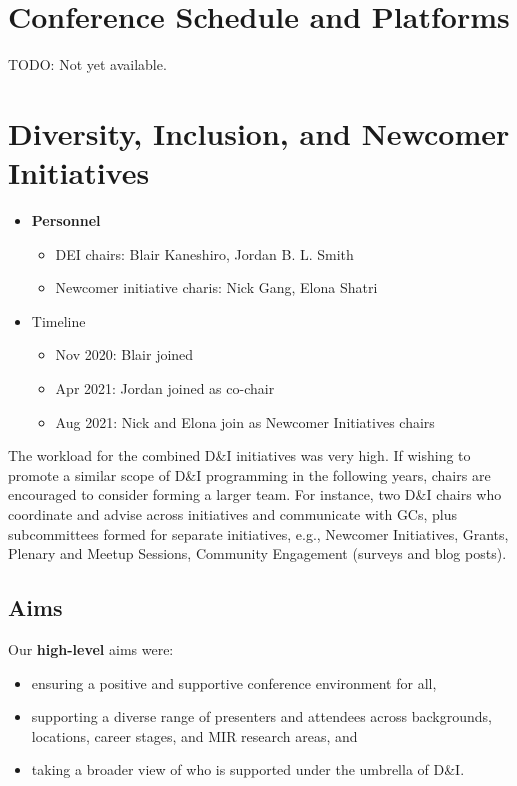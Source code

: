 \documentclass[%
10pt,								%
]
{scrartcl}
\begin{document}
\section{Conference Schedule and Platforms}
    TODO: Not yet available.
    
\section{Diversity, Inclusion, and Newcomer Initiatives}
    \begin{itemize}
        \item \textbf{Personnel}
            \begin{itemize}
                \item   DEI chairs: Blair Kaneshiro, Jordan B. L. Smith
                \item   Newcomer initiative charis: Nick Gang, Elona Shatri
            \end{itemize}
        \item   Timeline
            \begin{itemize}
                \item   Nov 2020: Blair joined 
                \item   Apr 2021: Jordan joined as co-chair
                \item   Aug 2021: Nick and Elona join as Newcomer Initiatives chairs
            \end{itemize}
    \end{itemize}
    
    The workload for the combined D\&I initiatives was very high. If wishing to promote a similar scope of D\&I programming in the following years, chairs are encouraged to consider forming a larger team. For instance, two D\&I chairs who coordinate and advise across initiatives and communicate with GCs, plus subcommittees formed for separate initiatives, e.g., Newcomer Initiatives, Grants, Plenary and Meetup Sessions, Community Engagement (surveys and blog posts).

    \subsection{Aims}
        Our \textbf{high-level} aims were:
        \begin{itemize}
            \item   ensuring a positive and supportive conference environment for all,
            \item   supporting a diverse range of presenters and attendees across backgrounds, locations, career stages, and MIR research areas, and
            \item   taking a broader view of who is supported under the umbrella of D\&I.
        \end{itemize}
\end{document}
